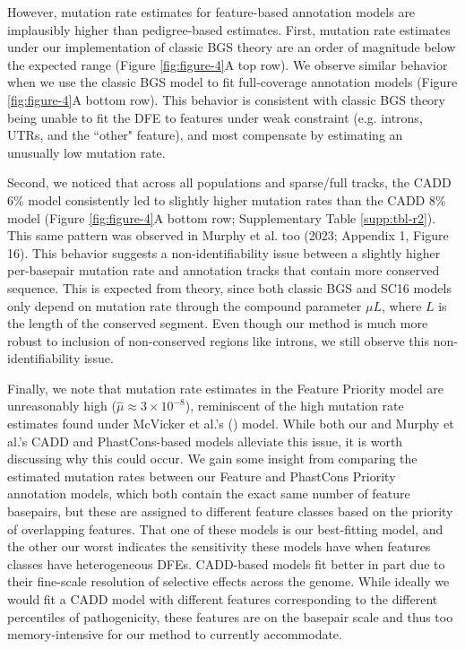\documentclass[11pt]{article}
\begin{document}
However, mutation rate estimates for feature-based annotation models are
implausibly higher than pedigree-based estimates. First, mutation rate
estimates under our implementation of classic BGS theory are an order of
magnitude below the expected range (Figure \ref{fig:figure-4}A top row). We
observe similar behavior when we use the classic BGS model to fit full-coverage
annotation models (Figure \ref{fig:figure-4}A bottom row). This behavior is
consistent with classic BGS theory being unable to fit the DFE to features
under weak constraint (e.g. introns, UTRs, and the ``other" feature), and most
compensate by estimating an unusually low mutation rate.

Second, we noticed that across all populations and sparse/full tracks, the CADD
6\% model consistently led to slightly higher mutation rates than the CADD 8\%
model (Figure \ref{fig:figure-4}A bottom row; Supplementary Table
\ref{supp:tbl-r2}). This same pattern was observed in Murphy et al. too (2023;
Appendix 1, Figure 16). This behavior suggests a non-identifiability issue
between a slightly higher per-basepair mutation rate and annotation tracks that
contain more conserved sequence. This is expected from theory, since both
classic BGS and SC16 models only depend on mutation rate through the compound
parameter $\mu L$, where $L$ is the length of the conserved segment. Even
though our method is much more robust to inclusion of non-conserved regions
like introns, we still observe this non-identifiability issue.

Finally, we note that mutation rate estimates in the Feature Priority model are
unreasonably high ($\widehat{\mu} \approx 3 \times 10^{-8}$), reminiscent of
the high mutation rate estimates found under McVicker et al.'s
(\citeyear{McVicker2009-ax}) model. While both our and Murphy et al.'s CADD and
PhastCons-based models alleviate this issue, it is worth discussing why this
could occur. We gain some insight from comparing the estimated mutation rates
between our Feature and PhastCons Priority annotation models, which both
contain the exact same number of feature basepairs, but these are assigned to
different feature classes based on the priority of overlapping features. That
one of these models is our best-fitting model, and the other our worst
indicates the sensitivity these models have when features classes have
heterogeneous DFEs. CADD-based models fit better in part due to their
fine-scale resolution of selective effects across the genome. While ideally we
would fit a CADD model with different features corresponding to the different
percentiles of pathogenicity, these features are on the basepair scale and thus
too memory-intensive for our method to currently accommodate.
\end{document}
